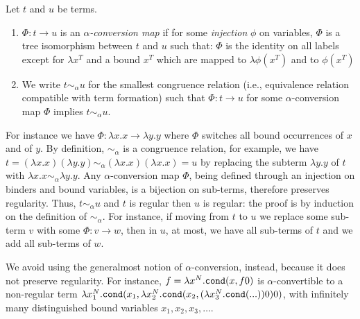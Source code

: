 \begin{definition}
\label{definition-alpha-conversion}
Let $t$ and $u$ be terms.
\begin{enumerate}
\item
$\Phi:t \rightarrow u$ is an \emph{$\alpha$-conversion map} if  
for some \emph{injection} $\phi$ on variables,
$\Phi$ is a tree isomorphism between $t$ and $u$ such that:
$\Phi$ is the identity on all labels except for $\lambda x^T$ and a bound $x^T$
which are mapped to $\lambda \phi(x^T)$ and to $\phi(x^T)$

\item
We write $t \sim_\alpha u$ for the smallest congruence relation (i.e.,
equivalence relation compatible with term formation)
such that $\Phi:t \rightarrow u$ for some $\alpha$-conversion map $\Phi$
implies $t \sim_\alpha u$.
\end{enumerate}
\end{definition}
For instance we have $\Phi:\lambda x.x \rightarrow \lambda y.y$ where
$\Phi$ switches all bound occurrences of $x$ and of $y$.
By definition, $\sim_\alpha$ is a congruence relation, for example, we have
$t = (\lambda x.x)(\lambda y.y) \sim_\alpha (\lambda x.x)(\lambda x.x) = u$ 
by replacing the subterm $\lambda y.y$ of $t$ with $\lambda x.x \sim_\alpha \lambda y.y$.
Any $\alpha$-conversion map $\Phi$, being defined through an injection
on binders and bound variables, is a bijection on sub-terms, therefore
preserves regularity. 
Thus, $t \sim_\alpha u$ and $t$ is regular then $u$ is regular: the proof is
by induction on the definition of $\sim_\alpha$. For instance, if
moving from $t$ to $u$ we replace some sub-term $v$ with some $\Phi:v \rightarrow w$,
then in $u$, at most, we have all sub-terms of $t$ and we add all sub-terms of $w$.

We avoid using the generalmost notion of $\alpha$-conversion, instead, because it does
not preserve regularity. For instance,
$f = \lambda x^{N}.{\tt cond}(x,f0)$ is $\alpha$-convertible to 
a non-regular term 
$\lambda x_1^{N}.{\tt cond}(x_1,\lambda x_2^{N}.{\tt cond}(x_2,(\lambda x_3^{N}.{\tt cond}(...))0)0)$,
with infinitely many distinguished bound variables $x_1,x_2,x_3,\ldots$. 

